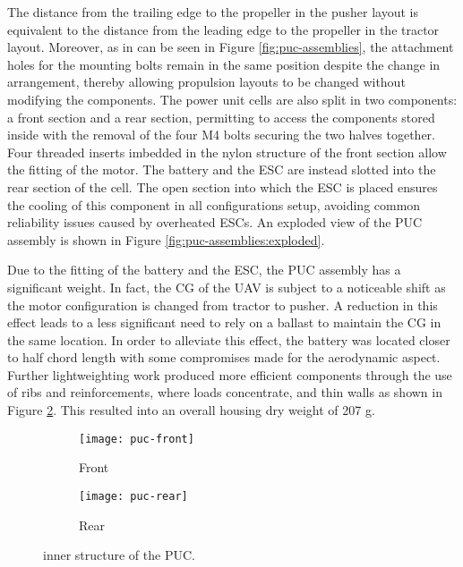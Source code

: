 \documentclass[../../main.tex]{subfiles}
\begin{document}
The distance from the trailing edge to the propeller in the pusher layout is equivalent to the distance from the leading edge to the propeller in the tractor layout.
Moreover, as in can be seen in Figure \ref{fig:puc-assemblies}, the attachment holes for the mounting bolts remain in the same position despite the change in arrangement, thereby allowing propulsion layouts to be changed without modifying the components. 
The power unit cells are also split in two components: a front section and a rear section, permitting to access the components stored inside with the removal of the four M4 bolts securing the two halves together.
Four threaded inserts imbedded in the nylon structure of the front section allow the fitting of the motor.
The battery and the ESC are instead slotted into the rear section of the cell.
The open section into which the ESC is placed ensures the cooling of this component in all configurations setup, avoiding common reliability issues caused by overheated ESCs.
An exploded view of the PUC assembly is shown in Figure \ref{fig:puc-assemblies:exploded}. 


Due to the fitting of the battery and the ESC, the PUC assembly has a significant weight.
In fact, the CG of the UAV is subject to a noticeable shift as the motor configuration is changed from tractor to pusher.
A reduction in this effect leads to a less significant need to rely on a ballast to maintain the CG in the same location. 
In order to alleviate this effect, the battery was located closer to half chord length with some compromises made for the aerodynamic aspect.
Further lightweighting work produced more efficient components through the use of ribs and reinforcements, where loads concentrate, and thin walls as shown in Figure \ref{fig:puc-design:rear}.
This resulted into an overall housing dry weight of 207 g. 


\begin{figure}[H]
    \centering
    \begin{subfigure}[b]{0.4\columnwidth}
        \centering
        \texttt{[image: puc-front]}
        \caption{Front}
        \label{fig:puc-design:front}
    \end{subfigure}
    \hfill
    \begin{subfigure}[b]{0.4\columnwidth}
        \centering
        \texttt{[image: puc-rear]}
        \caption{Rear}
        \label{fig:puc-design:rear}
    \end{subfigure}
    
    \caption{inner structure of the PUC.}
    \label{fig:puc-design}
\end{figure}
\end{document}
